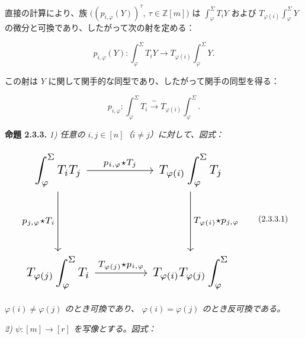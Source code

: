 \clearpage
{}%
直接の計算により、族
$\bigl((p_{i,\varphi}(Y))^\tau,\ \tau\in\mathbb Z[m]\bigr)$
は $\int_\varphi^\Sigma T_iY$ および
$T_{\varphi(i)}\int_\varphi^\Sigma Y$ の微分と可換であり、したがって次の射を定める：

\begin{equation}
  p_{i,\varphi}(Y)\colon
  \int_\varphi^\Sigma T_iY
  \longrightarrow
  T_{\varphi(i)}\int_\varphi^\Sigma Y.
  \tag{2.3.2.2}
\end{equation}

この射は $Y$ に関して関手的な同型であり、したがって関手の同型を得る：

\begin{equation}
  p_{i,\varphi}\colon
  \int_\varphi^\Sigma T_i
  \xrightarrow{\ \sim\ }
  T_{\varphi(i)}\int_\varphi^\Sigma.
  \tag{2.3.2.3}
\end{equation}

\noindent\textbf{命題 2.3.3.}\quad
\emph{1) 任意の $i,j\in[n]$（$i\ne j$）に対して、図式：}

\begin{equation}
  \resizebox{0.78\textwidth}{!}{%
    $\begin{tikzcd}[ampersand replacement=\&,column sep=4.2em,row sep=4.8em]
      \displaystyle\int_\varphi^\Sigma T_iT_j
        \arrow[r,"{p_{i,\varphi}\star T_j}"]
        \arrow[d,"{p_{j,\varphi}\star T_i}"']
        \& \displaystyle T_{\varphi(i)}\int_\varphi^\Sigma T_j
          \arrow[d,"{T_{\varphi(i)}\star p_{j,\varphi}}"] \\
      \displaystyle T_{\varphi(j)}\int_\varphi^\Sigma T_i
        \arrow[r,"{T_{\varphi(j)}\star p_{i,\varphi}}"]
        \& \displaystyle T_{\varphi(i)}T_{\varphi(j)}\int_\varphi^\Sigma
    \end{tikzcd}$%
  }
  \tag{2.3.3.1}
\end{equation}

\emph{$\varphi(i)\ne\varphi(j)$ のとき可換であり、
$\varphi(i)=\varphi(j)$ のとき反可換である。}

\emph{2) $\psi\colon[m]\longrightarrow[r]$ を写像とする。図式：}

